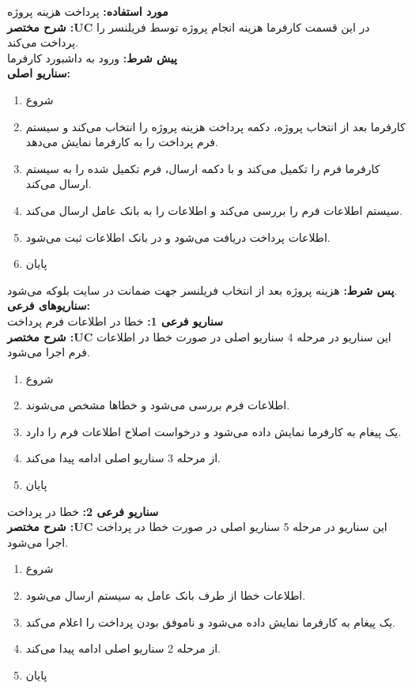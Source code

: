 \textbf{مورد استفاده:}
پرداخت هزینه پروژه
\\
\textbf{شرح مختصر :UC}
در این قسمت کارفرما هزینه انجام پروژه توسط فریلنسر را پرداخت می‌کند.
\\
\textbf{پيش شرط:}
ورود به داشبورد کارفرما
\\
\textbf{سناريو اصلی:}
\begin{enumerate}
\item
شروع
\item
کارفرما بعد از انتخاب پروژه، دکمه پرداخت هزینه پروژه را انتخاب می‌کند و سیستم فرم پرداخت را به کارفرما نمایش می‌دهد.
\item
کارفرما فرم را تکمیل می‌کند و با دکمه ارسال، فرم تکمیل شده را به سیستم ارسال می‌کند.
\item
سیستم اطلاعات فرم را بررسی می‌کند و اطلاعات را به بانک عامل ارسال می‌کند.
\item
اطلاعات پرداخت دریافت می‌شود و در بانک اطلاعات ثبت می‌شود.
\item
پایان
\end{enumerate}

\noindent
\textbf{پس شرط:}
هزینه پروژه بعد از انتخاب فریلنسر جهت ضمانت در سایت بلوکه می‌شود.
\\
\textbf{سناريوهای فرعی:}
\\
\textbf{سناريو فرعی 1:}
خطا در اطلاعات فرم پرداخت
\\
\textbf{شرح مختصر :UC}
این سناریو در مرحله 4 سناریو اصلی در صورت خطا در اطلاعات فرم اجرا می‌شود.
\begin{enumerate}
\item
شروع
\item
اطلاعات فرم بررسی می‌شود و خطاها مشخص می‌شوند.
\item
یک پیغام به کارفرما نمایش داده می‌شود و درخواست اصلاح اطلاعات فرم را دارد.
\item
از مرحله 3 سناریو اصلی ادامه پیدا می‌کند.
\item
پایان
\end{enumerate}

\noindent
\textbf{سناريو فرعی 2:}
خطا در پرداخت
\\
\textbf{شرح مختصر :UC}
این سناریو در مرحله 5 سناریو اصلی در صورت خطا در پرداخت اجرا می‌شود.
\begin{enumerate}
\item
شروع
\item
اطلاعات خطا از طرف بانک عامل به سیستم ارسال می‌شود.
\item
یک پیغام به کارفرما نمایش داده می‌شود و ناموفق بودن پرداخت را اعلام می‌کند.
\item
از مرحله 2 سناریو اصلی ادامه پیدا می‌کند.
\item
پایان
\end{enumerate}

